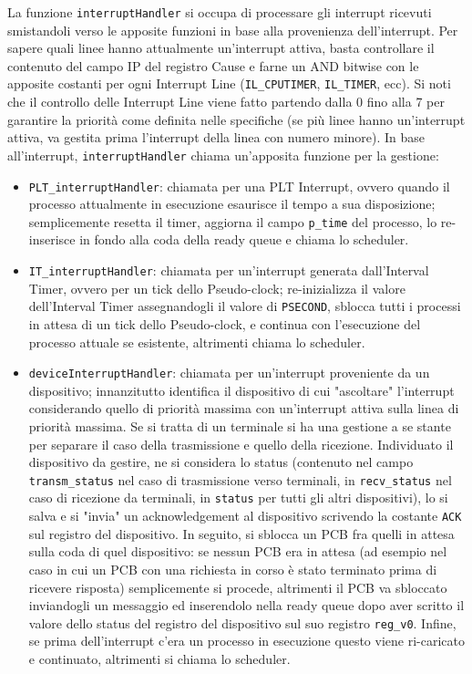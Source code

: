\documentclass[a4paper]{article}
\begin{document}
La funzione \verb+interruptHandler+ si occupa di processare gli interrupt ricevuti smistandoli verso le apposite funzioni in base alla provenienza dell'interrupt. Per sapere quali linee hanno attualmente un'interrupt attiva, basta controllare il contenuto del campo IP del registro Cause e farne un AND bitwise con le apposite costanti per ogni Interrupt Line (\verb+IL_CPUTIMER+, \verb+IL_TIMER+, ecc). Si noti che il controllo delle Interrupt Line viene fatto partendo dalla 0 fino alla 7 per garantire la priorità come definita nelle specifiche (se più linee hanno un'interrupt attiva, va gestita prima l'interrupt della linea con numero minore). In base all'interrupt, \verb+interruptHandler+ chiama un'apposita funzione per la gestione:
\begin{itemize}
\item \verb+PLT_interruptHandler+: chiamata per una PLT Interrupt, ovvero quando il processo attualmente in esecuzione esaurisce il tempo a sua disposizione; semplicemente resetta il timer, aggiorna il campo \verb+p_time+ del processo, lo re-inserisce in fondo alla coda della ready queue e chiama lo scheduler.
\item \verb+IT_interruptHandler+: chiamata per un'interrupt generata dall'Interval Timer, ovvero per un tick dello Pseudo-clock; re-inizializza il valore dell'Interval Timer assegnandogli il valore di \verb+PSECOND+, sblocca tutti i processi in attesa di un tick dello Pseudo-clock, e continua con l'esecuzione del processo attuale se esistente, altrimenti chiama lo scheduler.
\item \verb+deviceInterruptHandler+: chiamata per un'interrupt proveniente da un dispositivo; innanzitutto identifica il dispositivo di cui "ascoltare" l'interrupt considerando quello di priorità massima con un'interrupt attiva sulla linea di priorità massima. Se si tratta di un terminale si ha una gestione a se stante per separare il caso della trasmissione e quello della ricezione. Individuato il dispositivo da gestire, ne si considera lo status (contenuto nel campo \verb+transm_status+ nel caso di trasmissione verso terminali, in \verb+recv_status+ nel caso di ricezione da terminali, in \verb+status+ per tutti gli altri dispositivi), lo si salva e si "invia" un acknowledgement al dispositivo scrivendo la costante \verb+ACK+ sul registro del dispositivo. In seguito, si sblocca un PCB fra quelli in attesa sulla coda di quel dispositivo: se nessun PCB era in attesa (ad esempio nel caso in cui un PCB con una richiesta in corso è stato terminato prima di ricevere risposta) semplicemente si procede, altrimenti il PCB va sbloccato inviandogli un messaggio ed inserendolo nella ready queue dopo aver scritto il valore dello status del registro del dispositivo sul suo registro \verb+reg_v0+. Infine, se prima dell'interrupt c'era un processo in esecuzione questo viene ri-caricato e continuato, altrimenti si chiama lo scheduler.
\end{itemize}
\end{document}
